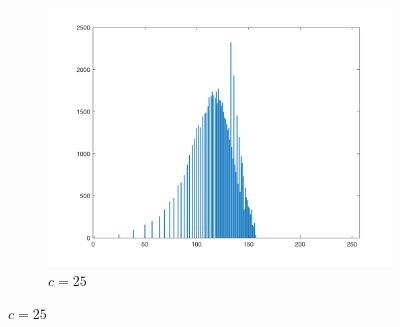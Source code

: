 \documentclass{article}
\begin{document}
\begin{enumerate}[label=(\alph*)]
\begin{figure}[!htb]
\begin{subfigure}[b]{0.3\textwidth}
            \includegraphics[width=\textwidth]{img/hist_LT25.png}
            \caption{$c = 25$}
        \end{subfigure}
        
        

\end{figure}
\end{enumerate}
\end{document}
